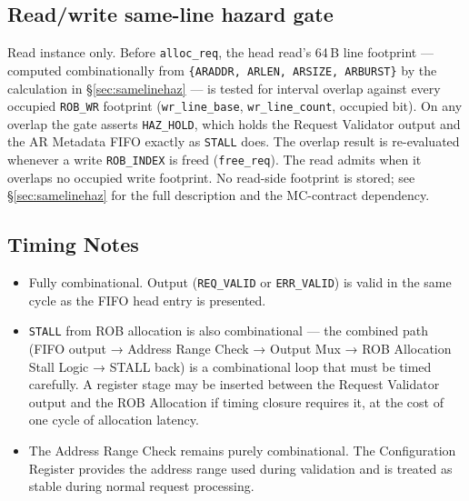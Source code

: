 \subsection{Read/write same-line hazard gate}

Read instance only.  Before \texttt{alloc\_req}, the head read's 64\,B line
footprint --- computed combinationally from
\texttt{\{ARADDR, ARLEN, ARSIZE, ARBURST\}} by the calculation in
\S\ref{sec:samelinehaz} --- is tested for interval overlap against every
occupied \texttt{ROB\_WR} footprint (\texttt{wr\_line\_base},
\texttt{wr\_line\_count}, occupied bit).  On any overlap the gate asserts
\texttt{HAZ\_HOLD}, which holds the Request Validator output and the AR
Metadata FIFO exactly as \texttt{STALL} does.  The overlap result is
re-evaluated whenever a write \texttt{ROB\_INDEX} is freed
(\texttt{free\_req}).  The read admits when it overlaps no occupied write
footprint.  No read-side footprint is stored; see \S\ref{sec:samelinehaz} for
the full description and the MC-contract dependency.

\subsection{Timing Notes}

\begin{itemize}
  \item Fully combinational. Output (\texttt{REQ\_VALID} or
        \texttt{ERR\_VALID}) is valid in the same cycle as the FIFO
        head entry is presented.
  \item \texttt{STALL} from ROB allocation is also combinational —
        the combined path (FIFO output → Address Range Check → Output
        Mux → ROB Allocation Stall Logic → STALL back) is a
        combinational loop that must be timed carefully. A register
        stage may be inserted between the Request Validator output and
        the ROB Allocation if timing closure requires it, at the
        cost of one cycle of allocation latency.
  \item The Address Range Check remains purely combinational. 
        The Configuration Register provides the address range used during validation and is treated as stable during normal request processing.
\end{itemize}

